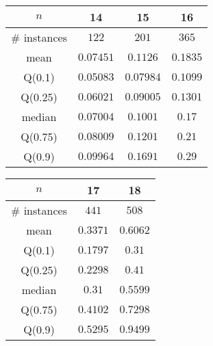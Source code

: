 \begin{tabular}{c|ccc} 
\hline 
$n$ & 14 & 15 & 16 \tabularnewline 
\hline 
\hline 
\# instances & $122$ & $201$ & $365$ \tabularnewline 
mean & $0.07451$ & $0.1126$ & $0.1835$ \tabularnewline 
Q(0.1) & $0.05083$ & $0.07984$ & $0.1099$ \tabularnewline 
Q(0.25) & $0.06021$ & $0.09005$ & $0.1301$ \tabularnewline 
median & $0.07004$ & $0.1001$ & $0.17$ \tabularnewline 
Q(0.75) & $0.08009$ & $0.1201$ & $0.21$ \tabularnewline 
Q(0.9) & $0.09964$ & $0.1691$ & $0.29$ \tabularnewline 
\hline 
\end{tabular} 
\medskip{} 

\begin{tabular}{c|cc} 
\hline 
$n$ & 17 & 18 \tabularnewline 
\hline 
\hline 
\# instances & $441$ & $508$ \tabularnewline 
mean & $0.3371$ & $0.6062$ \tabularnewline 
Q(0.1) & $0.1797$ & $0.31$ \tabularnewline 
Q(0.25) & $0.2298$ & $0.41$ \tabularnewline 
median & $0.31$ & $0.5599$ \tabularnewline 
Q(0.75) & $0.4102$ & $0.7298$ \tabularnewline 
Q(0.9) & $0.5295$ & $0.9499$ \tabularnewline 
\hline 
\end{tabular} 
\medskip{} 

